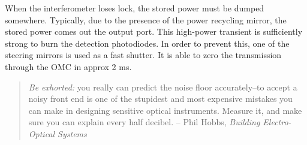 When the interferometer loses lock, the stored power must be dumped
somewhere. Typically, due to the presence of the power recycling mirror,
the stored power comes out the output port. This high-power transient
is sufficiently strong to burn the detection photodiodes. In order
to prevent this, one of the steering mirrors is used as a fast shutter.
It is able to zero the transmission through the OMC in approx 2 ms.


\begin{quote}
\emph{Be exhorted:} you really can predict the noise floor accurately--to
accept a noisy front end is one of the stupidest and most expensive
mistakes you can make in designing sensitive optical
instruments. Measure it, and make sure you can explain every half
decibel. -- Phil Hobbs, \emph{Building Electro-Optical Systems} \cite{Hobbs2009Building}
\end{quote}
